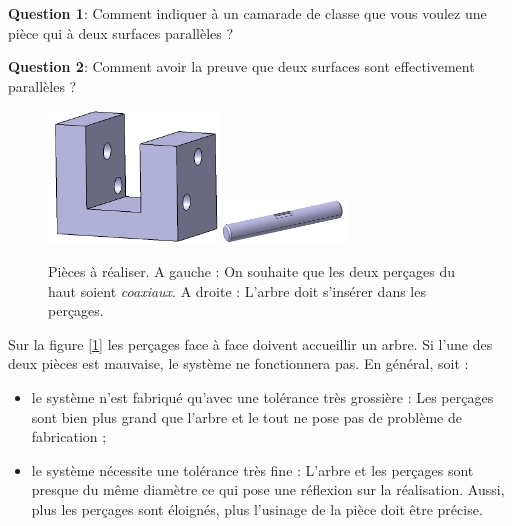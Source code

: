 \documentclass[
	11pt, %
	fleqn, %
	a4paper, %
]{LegrandOrangeBook}
\begin{document}
\begin{tcolorbox}[colback=gray!5!white,colframe=gray!75!ocre,title=Entrainement]

\textbf{Question 1}: Comment indiquer à un camarade de classe que vous voulez une pièce qui à deux surfaces parallèles ?

\textbf{Question 2}: Comment avoir la preuve que deux surfaces sont effectivement parallèles ?




\end{tcolorbox}


\begin{figure}[H] %
	\centering %
	\includegraphics[width=0.4\textwidth]{Images/pieceC.PNG}
    \includegraphics[width=0.3\textwidth]{Images/abr1.JPG}
	\caption{Pièces à réaliser. A gauche : On souhaite que les deux perçages du haut soient \textit{coaxiaux}. A droite : L'arbre doit s'insérer dans les perçages.}
	\label{pieceC} %
\end{figure}


Sur la figure [\ref{pieceC}] les perçages face à face doivent accueillir un arbre. Si l'une des deux pièces est mauvaise, le système ne fonctionnera pas. 
En général, soit : 
\begin{itemize}
    \item le système n'est fabriqué qu'avec une tolérance très grossière : Les perçages sont bien plus grand que l'arbre et le tout ne pose pas de problème de fabrication ;
    \item le système nécessite une tolérance très fine : L'arbre et les perçages sont presque du même diamètre ce qui pose une réflexion sur la réalisation. Aussi, plus les perçages sont éloignés, plus l'usinage de la pièce doit être précise. 
\end{itemize}
\end{document}
